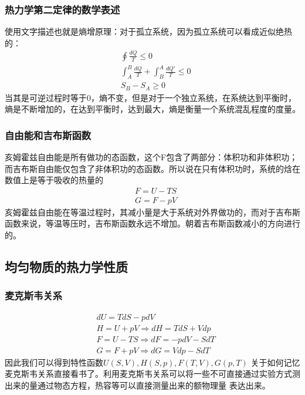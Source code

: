 \documentclass[UTF8]{ctexart}
\begin{document}
\subsubsection{热力学第二定律的数学表述}
使用文字描述也就是熵增原理：对于孤立系统，因为孤立系统可以看成近似绝热的：
\begin{align*}
         & \oint \frac{dQ}{T}\leq 0                            \\
         & \int_A^{B}\frac{dQ}{T}+\int_B^A \frac{dQ'}{T}\leq 0 \\
         & S_B-S_A\geq 0
\end{align*}
当其是可逆过程时等于0，熵不变，但是对于一个独立系统，在系统达到平衡时，熵是不断增加的，在达到平衡时，达到最大，熵是衡量一个系统混乱程度的度量。
\subsubsection{自由能和吉布斯函数}
亥姆霍兹自由能是所有做功的态函数，这个F包含了两部分：体积功和非体积功；而吉布斯自由能仅包含了非体积功的态函数。所以说在只有体积功时，系统的焓在数值上是等于吸收的热量的
\begin{align*}
         & F=U-TS \\
         & G=F-pV
\end{align*}
亥姆霍兹自由能在等温过程时，其减小量是大于系统对外界做功的，而对于吉布斯函数来说，等温等压时，吉布斯函数永远不增加。朝着吉布斯函数减小的方向进行的。
\subsection{均匀物质的热力学性质}
\subsubsection{麦克斯韦关系}
\begin{align*}
         & dU=TdS-pdV                    \\
         & H=U+pV\Rightarrow dH=TdS+Vdp  \\
         & F=U-TS\Rightarrow dF=-pdV-SdT \\
         & G=F+pV\Rightarrow dG=Vdp-SdT
\end{align*}
因此我们可以得到特性函数$U(S,V),H(S,p),F(T,V),G(p,T)$
关于如何记忆麦克斯韦关系直接看书了。利用麦克斯韦关系可以将一些不可直接通过实验方式测出来的量通过物态方程，热容等可以直接测量出来的额物理量
表达出来。
\end{document}
